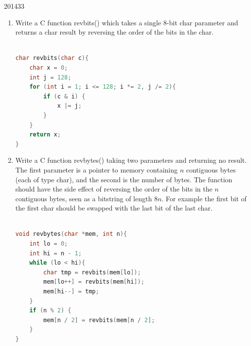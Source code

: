 \documentclass[10pt,\jkfside,a4paper]{article}
\begin{document}
\begin{examquestion}{2014}{3}{3}

\begin{enumerate}[label=(\alph*)]

\item Write a C function revbits() which takes a single 8-bit char parameter
and returns a char result by reversing the order of the bits in the char.

\begin{lstlisting}[language=C]

char revbits(char c){
	char x = 0;
	int j = 128;
	for (int i = 1; i <= 128; i *= 2, j /= 2){
		if (c & i) {
			x |= j;
		}
	}
	return x;
}

\end{lstlisting}

\item Write a C function revbytes() taking two parameters and returning no
result. The first parameter is a pointer to memory containing $n$ contiguous
bytes (each of type char), and the second is the number of bytes. The
function should have the side effect of reversing the order of the bits in
the $n$ contiguous bytes, seen as a bitstring of length $8n$. For example
the first bit of the first char should be swapped with the last bit of the
last char.

\begin{lstlisting}[language=C]

void revbytes(char *mem, int n){
	int lo = 0;
	int hi = n - 1;
	while (lo < hi){
		char tmp = revbits(mem[lo]);
		mem[lo++] = revbits(mem[hi]);
		mem[hi--] = tmp;
	}
	if (n % 2) {
		mem[n / 2] = revbits(mem[n / 2];
	}
}

\end{lstlisting}

\end{enumerate}

\end{examquestion}
\end{document}
